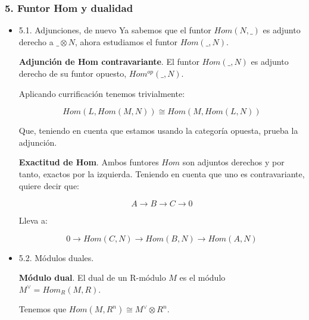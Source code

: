 \documentclass[11pt]{article}
\begin{document}
\subsubsection*{5. Funtor Hom y dualidad}
\label{sec-4-4-3}
\begin{itemize}
\item 5.1. Adjunciones, de nuevo
\label{sec-4-4-3-1}
Ya sabemos que el funtor $Hom(N,\_)$ es adjunto derecho a $\_\otimes N$, ahora
estudiamos el funtor $Hom(\_,N)$.

\begin{theorem}
\textbf{Adjunción de Hom contravariante}. El funtor $Hom(\_,N)$ es adjunto derecho
de su funtor opuesto, $Hom^{op}(\_,N)$.
\end{theorem}

Aplicando currificación tenemos trivialmente:

\[Hom(L,Hom(M,N)) \cong Hom(M,Hom(L,N))\]

Que, teniendo en cuenta que estamos usando la categoría opuesta, prueba la
adjunción.

\begin{proposition}
\textbf{Exactitud de Hom}. Ambos funtores $Hom$ son adjuntos derechos y por tanto,
exactos por la izquierda. Teniendo en cuenta que uno es contravariante, quiere
decir que:

\[ A \overset{}\longrightarrow B \overset{}\longrightarrow C \overset{}\longrightarrow 0\]

Lleva a:

\[ 0 \overset{}\longrightarrow Hom(C,N) \overset{}\longrightarrow 
 Hom(B,N) \overset{}\longrightarrow Hom(A,N)\]
\end{proposition}

\item 5.2. Módulos duales.
\label{sec-4-4-3-2}
\begin{definition}
\textbf{Módulo dual}. El dual de un R-módulo $M$ es el módulo $M^{\vee} = Hom_R(M,R)$.
\end{definition}

Tenemos que $Hom(M,R^n) \cong M^{\vee} \otimes R^n$.
\end{itemize}
\end{document}
